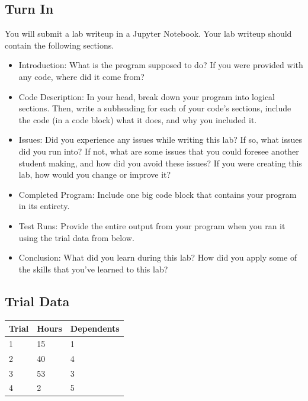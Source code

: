 \subsection*{Turn In}
You will submit a lab writeup in a Jupyter Notebook. Your lab writeup should contain the following sections.
\begin{itemize}
    \item Introduction: What is the program supposed to do? If you were provided with any code, where did it come from?
    \item Code Description: In your head, break down your program into logical sections. Then, write a subheading for each of your code's sections, include the code (in a code block) what it does, and why you included it.
    \item Issues: Did you experience any issues while writing this lab? If so, what issues did you run into? If not, what are some issues that you could foresee another student making, and how did you avoid these issues? If you were creating this lab, how would you change or improve it?
    \item Completed Program: Include one big code block that contains your program in its entirety.
    \item Test Runs: Provide the entire output from your program when you ran it using the trial data from below.
    \item Conclusion: What did you learn during this lab? How did you apply some of the skills that you've learned to this lab?
\end{itemize}

\subsection*{Trial Data}
\begin{tabular}{lll}
\hline
Trial & Hours & Dependents \\
\hline
1     & 15    & 1          \\
2     & 40    & 4          \\
3     & 53    & 3          \\
4     & 2     & 5          \\
\hline
\end{tabular}

